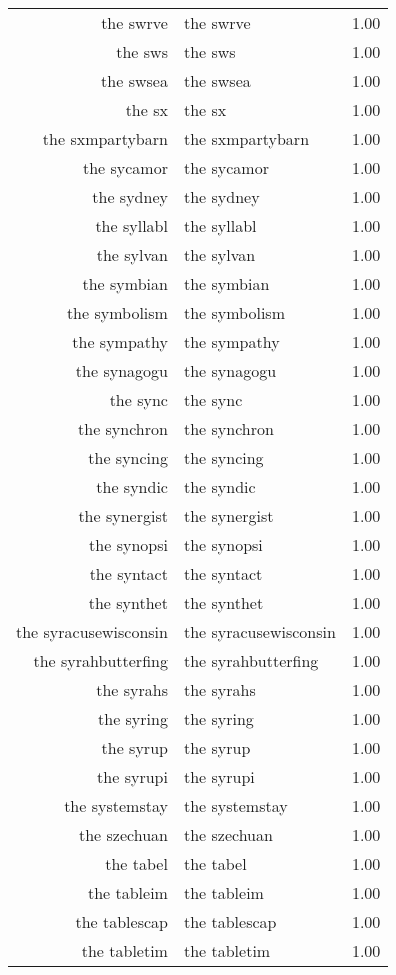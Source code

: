 \begin{table}[ht]
\begin{tabular}{rlr}
  the swrve & the swrve & 1.00 \\ 
  the sws & the sws & 1.00 \\ 
  the swsea & the swsea & 1.00 \\ 
  the sx & the sx & 1.00 \\ 
  the sxmpartybarn & the sxmpartybarn & 1.00 \\ 
  the sycamor & the sycamor & 1.00 \\ 
  the sydney & the sydney & 1.00 \\ 
  the syllabl & the syllabl & 1.00 \\ 
  the sylvan & the sylvan & 1.00 \\ 
  the symbian & the symbian & 1.00 \\ 
  the symbolism & the symbolism & 1.00 \\ 
  the sympathy & the sympathy & 1.00 \\ 
  the synagogu & the synagogu & 1.00 \\ 
  the sync & the sync & 1.00 \\ 
  the synchron & the synchron & 1.00 \\ 
  the syncing & the syncing & 1.00 \\ 
  the syndic & the syndic & 1.00 \\ 
  the synergist & the synergist & 1.00 \\ 
  the synopsi & the synopsi & 1.00 \\ 
  the syntact & the syntact & 1.00 \\ 
  the synthet & the synthet & 1.00 \\ 
  the syracusewisconsin & the syracusewisconsin & 1.00 \\ 
  the syrahbutterfing & the syrahbutterfing & 1.00 \\ 
  the syrahs & the syrahs & 1.00 \\ 
  the syring & the syring & 1.00 \\ 
  the syrup & the syrup & 1.00 \\ 
  the syrupi & the syrupi & 1.00 \\ 
  the systemstay & the systemstay & 1.00 \\ 
  the szechuan & the szechuan & 1.00 \\ 
  the tabel & the tabel & 1.00 \\ 
  the tableim & the tableim & 1.00 \\ 
  the tablescap & the tablescap & 1.00 \\ 
  the tabletim & the tabletim & 1.00 \\ 

\end{tabular}
\end{table}

